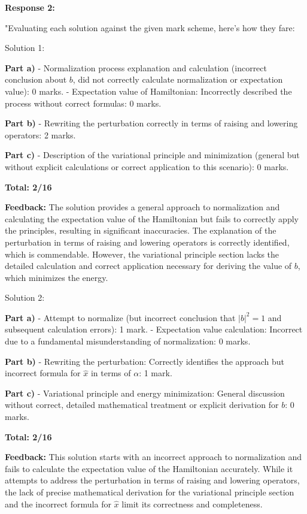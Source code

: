 \documentclass[a4paper,11pt]{article}
\begin{document}
\textbf{Response 2:}

"Evaluating each solution against the given mark scheme, here's how they fare:

Solution 1:

\textbf{Part a)}  
- Normalization process explanation and calculation (incorrect conclusion about $b$, did not correctly calculate normalization or expectation value): 0 marks.  
- Expectation value of Hamiltonian: Incorrectly described the process without correct formulas: 0 marks.

\textbf{Part b)}  
- Rewriting the perturbation correctly in terms of raising and lowering operators: 2 marks.  

\textbf{Part c)}  
- Description of the variational principle and minimization (general but without explicit calculations or correct application to this scenario): 0 marks.

\textbf{Total: 2/16}

\textbf{Feedback:}  
The solution provides a general approach to normalization and calculating the expectation value of the Hamiltonian but fails to correctly apply the principles, resulting in significant inaccuracies. The explanation of the perturbation in terms of raising and lowering operators is correctly identified, which is commendable. However, the variational principle section lacks the detailed calculation and correct application necessary for deriving the value of $b$, which minimizes the energy.

Solution 2:

\textbf{Part a)}  
- Attempt to normalize (but incorrect conclusion that $|b|^2 = 1$ and subsequent calculation errors): 1 mark.  
- Expectation value calculation: Incorrect due to a fundamental misunderstanding of normalization: 0 marks.

\textbf{Part b)}  
- Rewriting the perturbation: Correctly identifies the approach but incorrect formula for $\hat{x}$ in terms of $\alpha$: 1 mark.

\textbf{Part c)}  
- Variational principle and energy minimization: General discussion without correct, detailed mathematical treatment or explicit derivation for $b$: 0 marks.

\textbf{Total: 2/16}

\textbf{Feedback:}  
This solution starts with an incorrect approach to normalization and fails to calculate the expectation value of the Hamiltonian accurately. While it attempts to address the perturbation in terms of raising and lowering operators, the lack of precise mathematical derivation for the variational principle section and the incorrect formula for $\hat{x}$ limit its correctness and completeness. 
\end{document}
